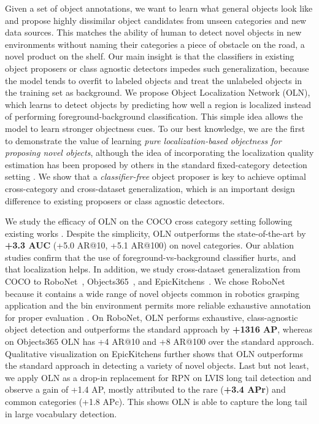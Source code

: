 \documentclass[10pt,twocolumn,letterpaper]{article}
\newcommand{\OURS}{OLN}
\begin{document}
Given a set of object annotations, we want to learn what general objects look like and propose highly dissimilar object candidates from unseen categories and new data sources. This matches the ability of human to detect novel objects in new environments without naming their categories \eg a piece of obstacle on the road, a novel product on the shelf. Our main insight is that the classifiers in existing object proposers \cite{kuo2015deepbox,pinheiro2015learning,vu2019cascade} or class agnostic detectors \cite{fasterNIPS2015,tian2019fcos} impedes such generalization, because the model tends to overfit to labeled objects and treat the unlabeled objects in the training set as background. We propose Object Localization Network (OLN), which learns to detect objects by predicting how well a region is localized instead of performing foreground-background classification. This simple idea allows the model to learn stronger objectness cues. To our best knowledge, we are the first to demonstrate the value of learning \textit{pure localization-based objectness for proposing novel objects}, although the idea of incorporating the localization quality estimation has been proposed by others in the standard fixed-category detection setting \cite{huang2019mask,jiang2018acquisition,tian2019fcos,wu2020iou}. We show that a \textit{classifier-free} object proposer is  key to achieve optimal cross-category and cross-dataset generalization, which is an important design difference to existing proposers or class agnostic detectors.

We study the efficacy of \OURS{} on the COCO cross category setting following existing works \cite{kuo2015deepbox,pinheiro2015learning,wang2020leads}. Despite the simplicity, OLN outperforms the state-of-the-art by \textbf{+3.3 AUC} (+5.0 AR@10, +5.1 AR@100) on novel categories. Our ablation studies confirm that the use of foreground-vs-background classifier hurts, and that localization helps. In addition, we study cross-dataset generalization from COCO to RoboNet~\cite{dasari2019robonet}, Objects365~\cite{shao2019objects365}, and EpicKitchens~\cite{Damen2020Collection}. We chose RoboNet because it contains a wide range of novel objects common in robotics grasping application and the bin environment permits more reliable exhaustive annotation for proper evaluation \cite{chavali2016object}. On RoboNet, \OURS{} performs exhaustive, class-agnostic object detection and outperforms the standard approach by \textbf{+1316 AP}, whereas on Objects365 \OURS{} has +4 AR@10 and +8 AR@100 over the standard approach. Qualitative visualization on EpicKitchens \cite{Damen2020Collection} further shows that \OURS{} outperforms the standard approach in detecting a variety of novel objects. Last but not least, we apply \OURS{} as a drop-in replacement for RPN\cite{fasterNIPS2015} on LVIS long tail detection \cite{gupta2019lvis} and observe a gain of +1.4 AP, mostly attributed to the rare (\textbf{+3.4 APr}) and common categories (+1.8 APc). This shows \OURS{} is able to capture the long tail in large vocabulary detection. 
\end{document}
